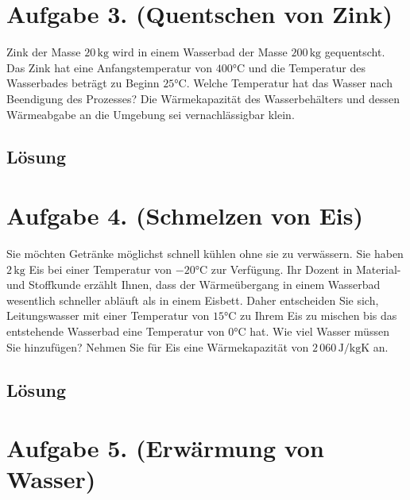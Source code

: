 \documentclass[german,12pt]{homework}
\newcommand{\sis}[1]{\,\si{#1}}
\newcommand{\degC}{\si{\degreeCelsius}}
\begin{document}
    \section*{Aufgabe 3. (Quentschen von Zink)}

    \begin{problem}
        Zink der Masse \(20\sis{\kilogram}\) wird in einem Wasserbad der Masse
        \(200\sis{\kilogram}\) gequentscht. Das Zink hat eine Anfangstemperatur
        von \(400\degC\) und die Temperatur des Wasserbades beträgt zu Beginn
        \(25\degC\). Welche Temperatur hat das Wasser nach Beendigung des
        Prozesses? Die Wärmekapazität des Wasserbehälters und dessen
        Wärmeabgabe an die Umgebung sei vernachlässigbar klein.
    \end{problem}

    \subsection*{Lösung}

    \section*{Aufgabe 4. (Schmelzen von Eis)}

    \begin{problem}
        Sie möchten Getränke möglichst schnell kühlen ohne sie zu verwässern. Sie haben \(2\sis{\kilogram}\) Eis bei einer Temperatur von
        \(-20\degC\) zur Verfügung. Ihr Dozent in Material- und Stoffkunde erzählt Ihnen, dass der Wärmeübergang in einem Wasserbad wesentlich schneller abläuft als in einem Eisbett. Daher entscheiden Sie sich, Leitungswasser mit einer Temperatur von \(15\degC\) zu Ihrem Eis zu mischen bis das entstehende Wasserbad eine Temperatur von \(0\degC\) hat. Wie viel Wasser müssen Sie hinzufügen? Nehmen Sie für Eis eine Wärmekapazität von \(2\,060\sis{\joule\per\kilogram\kelvin}\) an.
    \end{problem}

    \subsection*{Lösung}

    \section*{Aufgabe 5. (Erwärmung von Wasser)}
\end{document}

